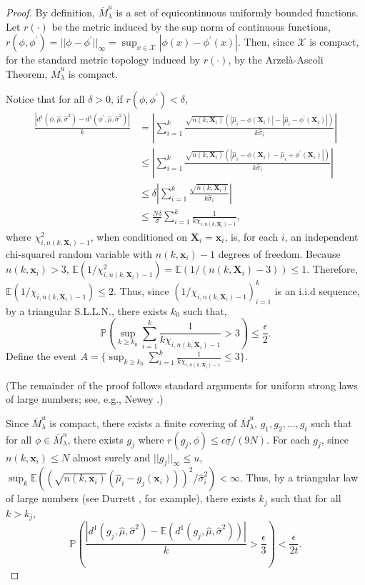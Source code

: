 \documentclass[10pt,a4paper]{amsart}
\newcommand{\spa}[1]{\text{{$\mathcal{#1}$}}}
\newcommand{\des}{\ensuremath{\bm{x}}}
\newcommand{\desCap}{\ensuremath{\bm{X}}}
\begin{document}
\begin{proof}
    By definition, $\overline{M}^u_\lambda$ is a set of equicontinuous uniformly bounded functions. Let $r(\cdot)$ be the metric induced by the sup norm of continuous functions, $r(\phi,\phi^\prime)=||\phi-\phi^\prime||_\infty=\sup_{x \in \spa{X}}|\phi(x)-\phi^\prime(x)|.$ Then, since $\spa{X}$ is compact, for the standard metric topology induced by $r(\cdot)$, by the Arzel\`a-Ascoli Theorem, $\overline{M}^u_\lambda$ is compact. 

    Notice that for all $\delta>0$, if $r(\phi,\phi^\prime)<\delta$, 
    \begin{equation*}
        \begin{split}
            \frac{\left |d^1(\phi,\hat{\mu},\hat{\sigma}^2)-d^1(\phi^\prime,\hat{\mu},\hat{\sigma}^2)\right |}{k}&=\left | \sum_{i=1}^k\frac{\sqrt{n(k,\desCap_i)}(|\hat{\mu}_i-\phi(\desCap_i)|-|\hat{\mu}_i-\phi^\prime(\desCap_i)|)}{k \hat{\sigma}_i} \right |\\
            & \leq \left | \sum_{i=1}^k\frac{\sqrt{n(k,\desCap_i)}(|\hat{\mu}_i-\phi(\desCap_i)-\hat{\mu}_i+\phi^\prime(\desCap_i)|)}{k \hat{\sigma}_i} \right |\\
            & \leq \delta \left | \sum_{i=1}^k\frac{\sqrt{n(k,\desCap_i)}}{k \hat{\sigma}_i} \right |\\
            & \leq \frac{N\delta}{\bar{\sigma}} \sum_{i=1}^k \frac{1}{k\chi_{i,n(k,\desCap_i)-1}},
        \end{split}
    \end{equation*}
    where $\chi_{i,n(k,\desCap_i)-1}^2$, when conditioned on $\desCap_i=\des_i$, is, for each $i$, an independent chi-squared random variable with $n(k,\des_i)-1$ degrees of freedom. Because $n(k,\des_i)>3$, $\mathbb{E}(1/\chi_{i,n(k,\desCap_i)-1}^2)=\mathbb{E}(1/(n(k,\desCap_i)-3))\leq 1$. Therefore, $\mathbb{E}(1/\chi_{i,n(k,\desCap_i)-1})\leq 2$. Thus, since $(1/\chi_{i,n(k,\desCap_i)-1})_{i=1}^k$ is an i.i.d sequence, by a triangular S.L.L.N., there exists $k_0$ such that,
    $$\mathbb{P}\left ( \sup_{k\geq k_0} \sum_{i=1}^k \frac{1}{k\chi_{i,n(k,\desCap_i)-1}} > 3\right )\leq \frac{\epsilon}{2}.$$
    Define the event $A=\{\sup_{k\geq k_0} \sum_{i=1}^k \frac{1}{k\chi_{i,n(k,\desCap_i)-1}} \leq 3\}$.
    
    (The remainder of the proof follows standard arguments for uniform strong laws of large numbers; see, e.g., Newey \cite{newey1991uniform}.)

    Since $\overline{M}^u_\lambda$ is compact, there exists a finite covering of $\overline{M}^u_\lambda$, $g_1,g_2,\ldots,g_t$ such that for all $\phi \in \overline{M}^u_\lambda$, there exists $g_j$ where $r(g_j,\phi)\leq \epsilon\underline{\sigma}/(9N)$. For each $g_j$, since $n(k,\des_i)\leq N$ almost surely and $||g_j||_\infty\leq u$, $\sup_k \mathbb{E}\left ((\sqrt{n(k,\des_i)}(\hat{\mu}_i-g_j(\des_i)))^2/\hat{\sigma}^2_i\right )<\infty$. Thus, by a triangular law of large numbers (see Durrett \cite{durrett2019probability}, for example), there exists $k_j$ such that for all $k>k_j$,
    $$\mathbb{P}\left (\frac{|d^1(g_j,\hat{\mu},\hat{\sigma}^2)-\mathbb{E}\left ( d^1(g_j,\hat{\mu},\hat{\sigma}^2)\right )|}{k}>\frac{\epsilon}{3}\right )<\frac{\epsilon}{2t}.$$
    

\end{proof}
\end{document}
